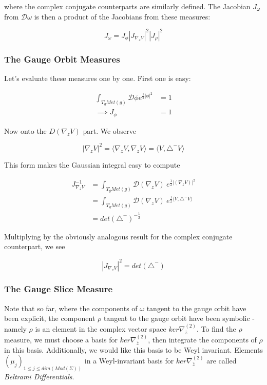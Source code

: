     where the complex conjugate counterparts are similarly defined. The Jacobian $J_\omega$ from $\mathcal D \omega$ is then a product of the Jacobians from these measures:

    \begin{equation}
        J_\omega = J_\phi |J_{\nabla_z V}|^2 |J_\rho|^2
    \end{equation}


\subsubsection{The Gauge Orbit Measures}

    Let's evaluate these measures one by one. First one is easy:

    \begin{align}
         \int_{T_g Met(g)} \mathcal D \phi e^{\frac12 |\phi|^2} &= 1 \\
            \implies J_\phi &= 1
    \end{align}

    Now onto the $D (\nabla_z V)$ part. We observe

    \begin{equation}
        |\nabla_z V|^2 = \langle \nabla_z V, \nabla_z V \rangle = \langle V, \triangle^- V \rangle
    \end{equation}

    This form makes the Gaussian integral easy to compute

    \begin{align}
        J_{\nabla_z V}^{-1} &= \int_{T_g Met(g)} \mathcal D (\nabla_z V) ~ e^{\frac12 |(\nabla_z V)|^2}\\
        &= \int_{T_g Met(g)} \mathcal D (\nabla_z V) ~ e^{\frac12 \langle V, \triangle^- V \rangle}\\
        &= det(\triangle^-)^{-\frac12}
    \end{align}

    Multiplying by the obviously analogous result for the complex conjugate counterpart, we see

    \begin{equation}
        |J_{\nabla_z V}|^2 = det(\triangle^-)
    \end{equation}

\subsubsection{The Gauge Slice Measure}

    Note that so far, where the components of $\omega$ tangent to the gauge orbit have been explicit, the component $\rho$ tangent to the gauge orbit have been symbolic - namely $\rho$ is an element in the complex vector space $ker \nabla^{(2)}_{\bar z}$. To find the $\rho$ measure, we must choose a basis for $ker \nabla^{(2)}_{\bar z}$, then integrate the components of $\rho$ in this basis. Additionally, we would like this basis to be Weyl invariant.  Elements $(\mu_j)_{1 \le j \le dim(Mod(\Sigma))}$ in a Weyl-invariant basis for $ker \nabla^{(2)}_{\bar z}$ are called \textit{Beltrami Differentials}.

